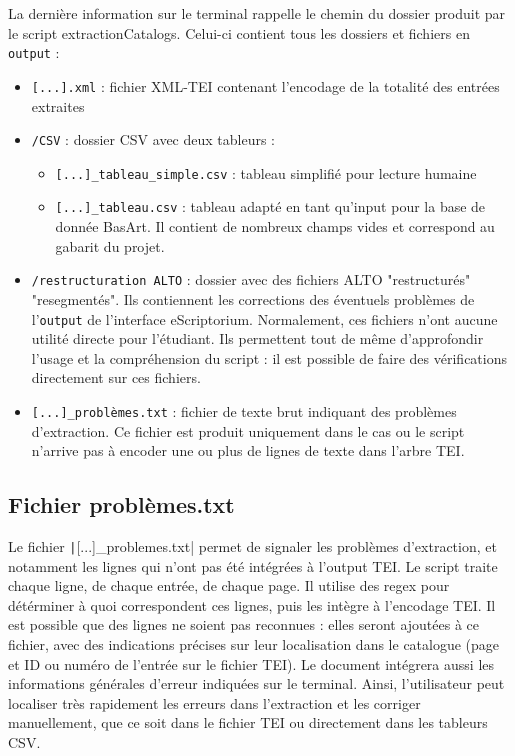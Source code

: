 \documentclass[a4paper,12pt,twoside]{book}
\begin{document}
La dernière information sur le terminal rappelle le chemin du dossier produit par le script extractionCatalogs. Celui-ci contient tous les dossiers et fichiers en \texttt{output} :
\begin{itemize}
	\item \texttt{[...].xml} : fichier XML-TEI contenant l'encodage de la totalité des entrées extraites 
	\item \texttt{/CSV} : dossier CSV avec deux tableurs :
	\begin{itemize}
		\item \texttt{[...]\_tableau\_simple.csv} : tableau simplifié pour lecture humaine
		\item \texttt{[...]\_tableau.csv} : tableau adapté en tant qu'input pour la base de donnée BasArt. Il contient de nombreux champs vides et correspond au gabarit du projet.
	\end{itemize}
	\item \texttt{/restructuration ALTO} : dossier avec des fichiers ALTO "restructurés" 
	 "resegmentés". Ils contiennent les corrections des éventuels problèmes de l'\texttt{output} de l'interface eScriptorium. Normalement, ces fichiers n'ont aucune utilité directe pour l'étudiant. Ils permettent tout de même d'approfondir l'usage et la compréhension du script : il est possible de faire des vérifications directement sur ces fichiers.
	\item \texttt{[...]\_problèmes.txt} : fichier de texte brut indiquant des problèmes d'extraction. Ce fichier est produit uniquement dans le cas ou le script n'arrive pas à encoder une ou plus de lignes de texte dans l'arbre TEI.
\end{itemize}


\subsection{Fichier problèmes.txt}

Le fichier \texttt|[...]_problemes.txt| permet de signaler les problèmes d'extraction, et notamment les lignes qui n'ont pas été intégrées à l'output TEI. Le script traite chaque ligne, de chaque entrée, de chaque page. Il utilise des regex pour détérminer à quoi correspondent ces lignes, puis les intègre à l'encodage TEI. Il est possible que des lignes ne soient pas reconnues : elles seront ajoutées à ce fichier, avec des indications précises sur leur localisation dans le catalogue (page et ID ou numéro de l'entrée sur le fichier TEI). Le document intégrera aussi les informations générales d'erreur indiquées sur le terminal. Ainsi, l'utilisateur peut localiser très rapidement les erreurs dans l'extraction et les corriger manuellement, que ce soit dans le fichier TEI ou directement dans les tableurs CSV.\\
\end{document}
